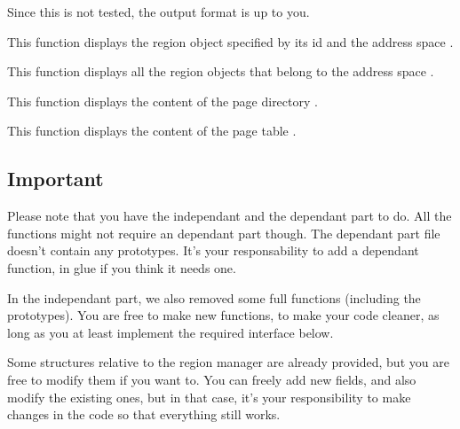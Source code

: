 \-

Since this is not tested, the output format is up to you.

{
  This function displays the region object specified by its id 
  and the address space .
}

{
  This function displays all the region objects that belong to the address
  space .
}

{
  This function displays the content of the page directory .
}

{
  This function displays the content of the page table .
}

\subsection*{Important}
Please note that you have the independant and the dependant part to do.
All the functions might not require an dependant part though. The dependant
part file doesn't contain any prototypes. It's your responsability to add a
dependant function, in glue if you think it needs one.

\-

In the independant part, we also removed some full functions (including the prototypes). You are free to make new functions, to make your code cleaner, as long as you at least implement the required interface below.

\-

Some structures relative to the region manager are already provided, but you
are free to modify them if you want to. You can freely add new fields, and also
modify the existing ones, but in that case, it's your responsibility to make
changes in the code so that everything still works.
